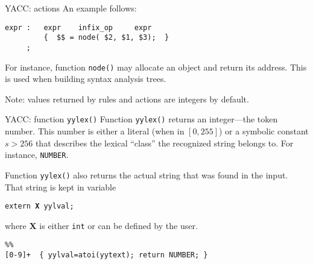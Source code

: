 \begin{frame}[fragile]{YACC: actions}
An example follows:


\vspace{20pt}

\begin{verbatim}
expr :   expr    infix_op     expr
         {  $$ = node( $2, $1, $3);  }
     ;
\end{verbatim}


\vspace{20pt}

For instance, function {\tt node()} may allocate an object and return
its address. This is used when building syntax analysis trees.

\vspace{20pt}


Note: values returned by rules and actions are integers by default.


\end{frame}
\begin{frame}[fragile]{YACC: function {\tt yylex()}}
Function {\tt yylex()} returns an integer---the token number.
This number is either a literal (when in $[0,255]$) or
a symbolic constant $s>256$ that describes the lexical ``class''
the recognized string belongs to. For instance,
{\tt NUMBER}. 


\vspace{20pt}

Function {\tt yylex()} also returns the actual string that
was found in the input. That string is kept in variable


\vspace{20pt}

\begin{center}\tt extern {\bf X} yylval;\end{center}


\vspace{20pt}

where {\bf X} is either {\tt int} or can be defined by the user.


\vspace{20pt}

\begin{verbatim}
%%
[0-9]+  { yylval=atoi(yytext); return NUMBER; }
\end{verbatim}



\end{frame}
